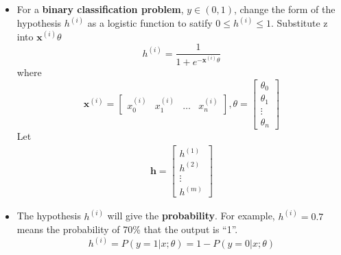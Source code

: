 \begin{itemize}
    \item For a \textbf{binary classification problem}, $y \in (0,1)$, change the form of the hypothesis  $h^{(i)}$ as a logistic function to satify $0 \leq h^{(i)} \leq 1$. Substitute z into $\mathbf{x}^{(i)}\theta$
    \begin{equation}
        h^{(i)} = \frac{1}{1+e^{-\mathbf{x}^{(i)}\theta}}
    \end{equation}
    where
    \begin{equation}
        \mathbf{x}^{(i)} = 
        \left[
            \begin{array}{cccc}
                x_0^{(i)} & x_1^{(i)} & \dots & x_n^{(i)}  
            \end{array}
        \right],
        \theta = 
        \left[
            \begin{array}{c}
                \theta_0 \\ \theta_1 \\ \vdots \\ \theta_n
            \end{array}
        \right]
    \end{equation}
    Let
    \begin{eqnarray}
        \mathbf{h} = 
        \left[
        \begin{array}{c}
            h^{(1)} \\ h^{(2)} \\ \vdots \\ h^{(m)}
        \end{array}
        \right]
    \end{eqnarray}
    \item The hypothesis $h^{(i)}$ will give the \textbf{probability}. For example, $h^{(i)}=0.7$ means the probability of 70\% that the output is ``1''.
    \begin{equation}
        h^{(i)} = P(y=1|x;\theta) = 1 - P(y=0|x;\theta)
    \end{equation}
\end{itemize}


